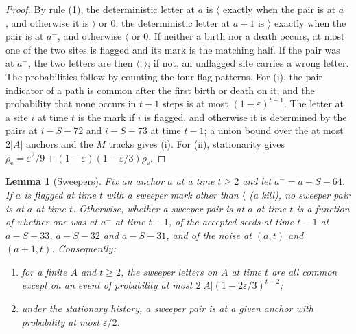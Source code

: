 \documentclass[11pt]{article}
\theoremstyle{plain}
\newtheorem{lemma}[theorem]{Lemma}
\theoremstyle{definition}
\theoremstyle{remark}
\newcommand{\eps}{\varepsilon}
\begin{document}
\begin{proof}
By rule (1), the deterministic letter at $a$ is $\langle$ exactly when the pair is at $a^-$, and otherwise it is $\rangle$ or $0$; the deterministic letter at $a+1$ is $\rangle$ exactly when the pair is at $a^-$, and otherwise $\langle$ or $0$. If neither a birth nor a death occurs, at most one of the two sites is flagged and its mark is the matching half. If the pair was at $a^-$, the two letters are then $\langle,\rangle$; if not, an unflagged site carries a wrong letter. The probabilities follow by counting the four flag patterns. For (i), the pair indicator of a path is common after the first birth or death on it, and the probability that none occurs in $t-1$ steps is at most $(1-\eps)^{t-1}$. The letter at a site $i$ at time $t$ is the mark if $i$ is flagged, and otherwise it is determined by the pairs at $i-S-72$ and $i-S-73$ at time $t-1$; a union bound over the at most $2|A|$ anchors and the $M$ tracks gives (i). For (ii), stationarity gives $\rho_{\mathrm e}=\eps^2/9+(1-\eps)(1-\eps/3)\rho_{\mathrm e}$.
\end{proof}

\begin{lemma}[Sweepers]\label{lem:sweeper}
Fix an anchor $a$ at a time $t\ge2$ and let $a^-=a-S-64$. If $a$ is flagged at time $t$ with a sweeper mark other than $\langle$ (a \emph{kill}), no sweeper pair is at $a$ at time $t$. Otherwise, whether a sweeper pair is at $a$ at time $t$ is a function of whether one was at $a^-$ at time $t-1$, of the accepted seeds at time $t-1$ at $a-S-33$, $a-S-32$ and $a-S-31$, and of the noise at $(a,t)$ and $(a+1,t)$. Consequently:
\begin{enumerate}[label=(\roman*)]
\item for a finite $A$ and $t\ge2$, the sweeper letters on $A$ at time $t$ are all common except on an event of probability at most $2|A|(1-2\eps/3)^{t-2}$;
\item under the stationary history, a sweeper pair is at a given anchor with probability at most $\eps/2$.
\end{enumerate}
\end{lemma}
\end{document}
